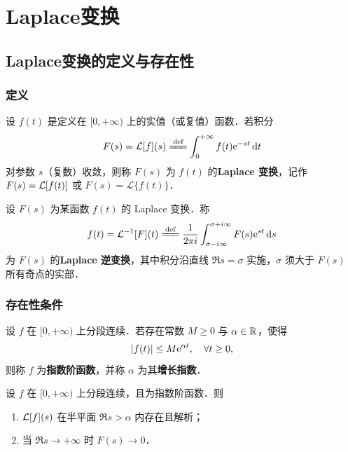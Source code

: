 \documentclass[12pt, a4paper, oneside, UTF8]{ctexbook}
\begin{document}
%
\else
\fi
\chapter{Laplace变换}

\section{Laplace变换的定义与存在性}

\subsection{定义}

\begin{definition}[Laplace 变换]
设 $f(t)$ 是定义在 $[0,+\infty)$ 上的实值（或复值）函数．若积分
\[
F(s) = \L[f](s) \defeq \int_0^{+\infty} f(t)\e^{-st}\,\d t
\]
对参数 $s$（复数）收敛，则称 $F(s)$ 为 $f(t)$ 的\textbf{Laplace 变换}，记作 $F(s) = \mathcal{L}[f(t)]$ 或 $F(s) = \mathscr{L}\{f(t)\}$．
\end{definition}

\begin{definition}
设 $F(s)$ 为某函数 $f(t)$ 的 Laplace 变换．称
\[
f(t) = \L^{-1}[F](t) \defeq \frac{1}{2\pi i}\int_{\sigma-i\infty}^{\sigma+i\infty} F(s)\e^{st}\,\d s
\]
为 $F(s)$ 的\textbf{Laplace 逆变换}，其中积分沿直线 $\Re s = \sigma$ 实施，$\sigma$ 须大于 $F(s)$ 所有奇点的实部．
\end{definition}

\subsection{存在性条件}

\begin{definition}[指数阶函数]
设 $f$ 在 $[0,+\infty)$ 上分段连续．若存在常数 $M\ge 0$ 与 $\alpha\in\mathbb{R}$，使得
\[
\abs{f(t)} \le M\mathrm{e}^{\alpha t},\quad \forall t\ge 0,
\]
则称 $f$ 为\textbf{指数阶函数}，并称 $\alpha$ 为其\textbf{增长指数}．
\end{definition}

\begin{theorem}
设 $f$ 在 $[0,+\infty)$ 上分段连续，且为指数阶函数．则
\begin{enumerate}
    \item $\mathcal{L}[f](s)$ 在半平面 $\Re s > \alpha$ 内存在且解析；
    \item 当 $\Re s\to+\infty$ 时 $F(s)\to 0$．
\end{enumerate}
\end{theorem}
\end{document}

